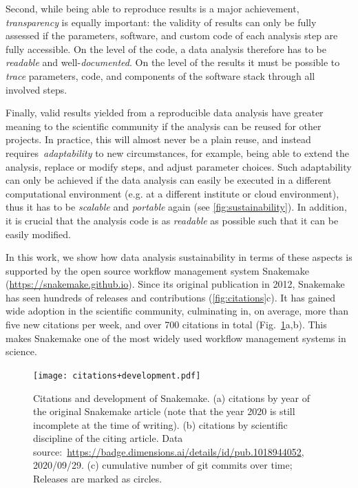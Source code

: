 \documentclass[parskip=half, DIV=18]{scrartcl}
\let\plainurl\url
\renewcommand{\url}[1]{\protect\plainurl{#1}}
\begin{document}
Second, while being able to reproduce results is a major achievement, \emph{transparency} is equally important: the validity of results can only be fully assessed if the parameters, software, and custom code of each analysis step are fully accessible.
On the level of the code, a data analysis therefore has to be \emph{readable} and well-\emph{documented}.
On the level of the results it must be possible to \emph{trace} parameters, code, and components of the software stack through all involved steps.

Finally, valid results yielded from a reproducible data analysis have greater meaning to the scientific community if the analysis can be reused for other projects.
In practice, this will almost never be a plain reuse, and instead requires~\emph{adaptability} to new circumstances, for example, being able to extend the analysis, replace or modify steps, and adjust parameter choices.
Such adaptability can only be achieved if the data analysis can easily be executed in a different computational environment (e.g. at a different institute or cloud environment), thus it has to be \emph{scalable} and \emph{portable} again (see \autoref{fig:sustainability}).
In addition, it is crucial that the analysis code is as \emph{readable} as possible such that it can be easily modified.

In this work, we show how data analysis sustainability in terms of these aspects is supported by the open source workflow management system Snakemake (\url{https://snakemake.github.io}).
Since its original publication in 2012, Snakemake has seen hundreds of releases and contributions (\autoref{fig:citations}c).
It has gained wide adoption in the scientific community, culminating in, on average, more than five new citations per week, and over 700 citations in total (Fig.~\ref{fig:citations}a,b).
This makes Snakemake one of the most widely used workflow management systems in science.

\begin{figure}
    \centering
	\texttt{[image: citations+development.pdf]}
	\caption{
		Citations and development of Snakemake.
		(a) citations by year of the original Snakemake article (note that the year 2020 is still incomplete at the time of writing).
		(b) citations by scientific discipline of the citing article.
		Data source:~\url{https://badge.dimensions.ai/details/id/pub.1018944052}, 2020/09/29.
		(c) cumulative number of git commits over time; Releases are marked as circles.
	}
	\label{fig:citations}
\end{figure}
\end{document}
